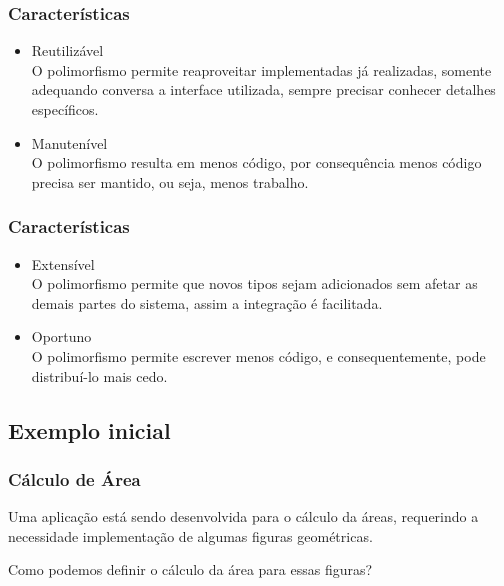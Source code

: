 \begin{frame}
\frametitle{Características}
\begin{itemize}
\item Reutilizável\\{\footnotesize O polimorfismo permite reaproveitar implementadas já realizadas, somente adequando conversa a interface utilizada, sempre precisar conhecer detalhes específicos.}
\item Manutenível\\{\footnotesize O polimorfismo resulta em menos código, por consequência menos código precisa ser mantido, ou seja, menos trabalho.}
\end{itemize}
\end{frame}

\begin{frame}
\frametitle{Características}
\begin{itemize}
\item Extensível\\{\footnotesize O polimorfismo permite que novos tipos sejam adicionados sem afetar as demais partes do sistema, assim a integração é facilitada}.
\item Oportuno\\{\footnotesize O polimorfismo permite escrever menos código, e consequentemente, pode distribuí-lo mais cedo.}
\end{itemize}
\end{frame}

\subsection{Exemplo inicial}

\begin{frame}
\frametitle{Cálculo de Área}
\quad Uma aplicação está sendo desenvolvida para o cálculo da áreas, requerindo a necessidade implementação de algumas figuras geométricas. 

\quad Como podemos definir o cálculo da área para essas figuras?
\end{frame}

